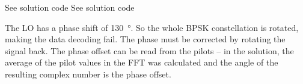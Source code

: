 \begin{solution}
	\begin{tasks}
		\task
		See solution code
		\task
		See solution code
		
		The LO has a phase shift of \SI{130}{\degree}. So the whole BPSK constellation is rotated, making the data decoding fail. The phase must be corrected by rotating the signal back. The phase offset can be read from the pilots -- in the solution, the average of the pilot values in the FFT was calculated and the angle of the resulting complex number is the phase offset.
	\end{tasks}
\end{solution}

%

